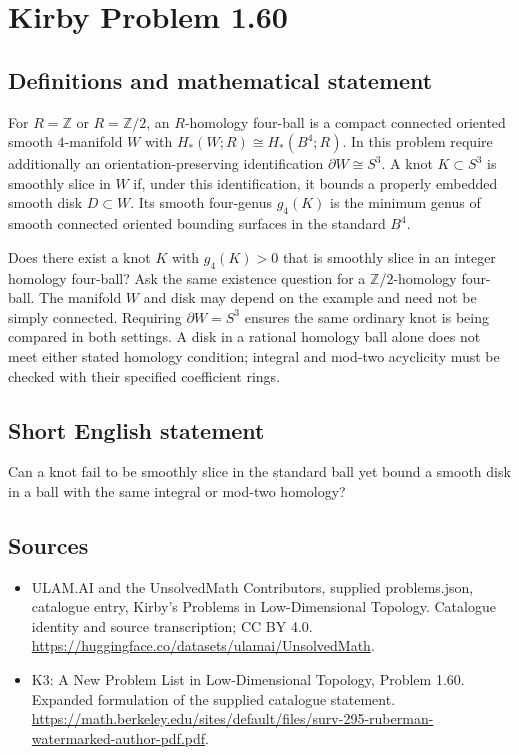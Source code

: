 \documentclass[11pt,a4paper]{article}
\begin{document}
\section*{Kirby Problem 1.60}\label{statement}

\subsection{Definitions and mathematical statement}
For $R=\mathbb Z$ or $R=\mathbb Z/2$, an $R$-homology four-ball is a compact
connected oriented smooth $4$-manifold $W$ with
$H_*(W;R)\cong H_*(B^4;R)$. In this problem require additionally an
orientation-preserving identification $\partial W\cong S^3$.
A knot $K\subset S^3$ is smoothly slice in $W$ if, under this identification,
it bounds a properly embedded smooth disk $D\subset W$.
Its smooth four-genus $g_4(K)$ is the minimum genus of smooth connected
oriented bounding surfaces in the standard $B^4$.

Does there exist a knot $K$ with $g_4(K)>0$ that is smoothly slice in an
integer homology four-ball? Ask the same existence question for a
$\mathbb Z/2$-homology four-ball.
The manifold $W$ and disk may depend on the example and need not be simply
connected. Requiring $\partial W=S^3$ ensures the same ordinary knot is being
compared in both settings. A disk in a rational homology ball alone does not
meet either stated homology condition; integral and mod-two acyclicity must be
checked with their specified coefficient rings.
\subsection{Short English statement}
Can a knot fail to be smoothly slice in the standard ball yet bound a smooth disk in a ball with the same integral or mod-two homology?
\subsection{Sources}
\begin{itemize}
\item[S1] ULAM.AI and the UnsolvedMath Contributors, supplied problems.json, catalogue entry, Kirby's Problems in Low-Dimensional Topology. Catalogue identity and source transcription; CC BY 4.0.
\url{https://huggingface.co/datasets/ulamai/UnsolvedMath}.
\item[S2] K3: A New Problem List in Low-Dimensional Topology, Problem 1.60. Expanded formulation of the supplied catalogue statement.
\url{https://math.berkeley.edu/sites/default/files/surv-295-ruberman-watermarked-author-pdf.pdf}.
\end{itemize}
\end{document}

